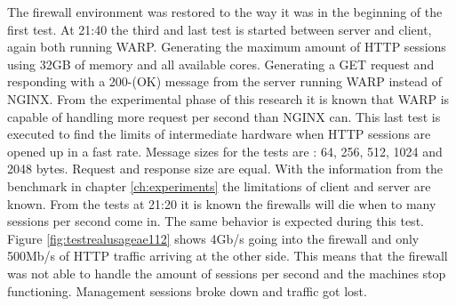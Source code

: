 The firewall environment was restored to the way it was in the beginning of the first test.
At 21:40 the third and last test is started between server and client, again both running WARP. Generating the maximum amount of HTTP sessions using 32GB of memory and all available cores.
Generating a GET request and responding with a 200-(OK) message from the server running WARP instead of NGINX.  
From the experimental phase of this research it is known that WARP is capable of handling more request per second than NGINX can. This last test is executed to find the limits of intermediate hardware when HTTP sessions are opened up in a fast rate.
Message sizes for the tests are : 64, 256, 512, 1024 and 2048 bytes. Request and response size are equal. 
With the information from the benchmark in chapter \ref{ch:experiments} the limitations of client and server are known. 
From the tests at 21:20 it is known the firewalls will die when to many sessions per second come in. The same behavior is expected during this test.
Figure \ref{fig:testrealusageae112} shows 4Gb/s going into the firewall and only 500Mb/s of HTTP traffic arriving at the other side.
This means that the firewall was not able to handle the amount of sessions per second and the machines stop functioning. 
Management sessions broke down and traffic got lost.


